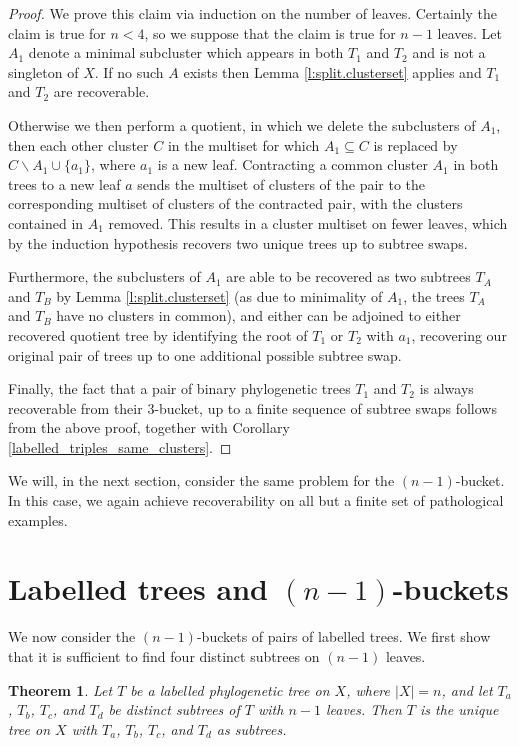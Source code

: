 \documentclass[12pt]{article}
\newtheorem{Theorem}{Theorem}[section]
\theoremstyle{definition}
\begin{document}
\begin{proof}
We prove this claim via induction on the number of leaves. Certainly the claim is true for $n<4$, so we suppose that the claim is true for $n-1$ leaves. Let $A_1$ denote a minimal subcluster which appears in both $T_1$ and $T_2$ and is not a singleton of $X$. If no such $A$ exists then Lemma \ref{l:split.clusterset} applies and $T_1$ and $T_2$ are recoverable. 

Otherwise we then perform a quotient, in which we delete the subclusters of $A_1$, then each other cluster $C$ in the multiset for which $A_1 \subseteq C$ is replaced by $C \backslash A_1 \cup \{a_1\}$, where $a_1$ is a new leaf. Contracting a common cluster $A_1$ in both trees to a new leaf $a$ sends the multiset of clusters of the pair to the corresponding multiset of clusters of the contracted pair, with the clusters contained in $A_1$ removed. This results in a cluster multiset on fewer leaves, which by the induction hypothesis recovers two unique trees up to subtree swaps.

Furthermore, the subclusters of $A_1$ are able to be recovered as two subtrees $T_A$ and $T_B$ by Lemma \ref{l:split.clusterset} (as due to minimality of $A_1$, the trees $T_A$ and $T_B$ have no clusters in common), and either can be adjoined to either recovered quotient tree by identifying the root of $T_1$ or $T_2$ with $a_1$, recovering our original pair of trees up to one additional possible subtree swap. 

Finally, the fact that a pair of binary phylogenetic trees $T_1$ and $T_2$ is always recoverable from their $3$-bucket, up to a finite sequence of subtree swaps follows from the above proof, together with Corollary \ref{labelled_triples_same_clusters}.
\end{proof}

We will, in the next section, consider the same problem for the $(n-1)$-bucket. In this case, we again achieve recoverability on all but a finite set of pathological examples.


\section{Labelled trees and \texorpdfstring{$(n-1)$}{(n-1)}-buckets}\label{s:labeln-1}

We now consider the $(n-1)$-buckets of pairs of labelled trees. We first show that it is sufficient to find four distinct subtrees on $(n-1)$ leaves.

\begin{Theorem} \label{n-1_labelled_recover_from_4}
    Let $T$ be a labelled phylogenetic tree on $X$, where $|X|=n$, and let $T_a$, $T_b$, $T_c$, and $T_d$ be distinct subtrees of $T$ with $n-1$ leaves. Then $T$ is the unique tree on $X$ with $T_a$, $T_b$, $T_c$, and $T_d$ as subtrees.
\end{Theorem}
\end{document}
